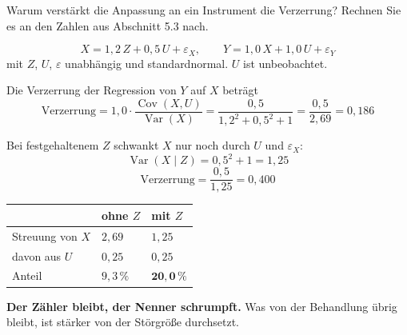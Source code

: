 \begin{aufgabe}
Warum verstärkt die Anpassung an ein Instrument die Verzerrung? Rechnen Sie es an den Zahlen aus Abschnitt 5.3 nach.

\loesung
{}
\[ X = 1{,}2\,Z + 0{,}5\,U + \varepsilon_X, \qquad Y = 1{,}0\,X + 1{,}0\,U + \varepsilon_Y \]
mit $Z$, $U$, $\varepsilon$ unabhängig und standardnormal. $U$ ist unbeobachtet.

Die Verzerrung der Regression von $Y$ auf $X$ beträgt
\[ \text{Verzerrung} = 1{,}0\cdot\frac{\operatorname{Cov}(X,U)}{\operatorname{Var}(X)} = \frac{0{,}5}{1{,}2^{2}+0{,}5^{2}+1} = \frac{0{,}5}{2{,}69} = 0{,}186 \]

 \checkmark

Bei festgehaltenem $Z$ schwankt $X$ nur noch durch $U$ und $\varepsilon_X$:
\[ \operatorname{Var}(X \mid Z) = 0{,}5^{2}+1 = 1{,}25 \]
\[ \text{Verzerrung} = \frac{0{,}5}{1{,}25} = 0{,}400 \]

 \checkmark

\begin{center}
{\small
\renewcommand{\arraystretch}{1.5}
\begin{tabular}{@{}P{3.0cm}P{2.4cm}P{2.4cm}@{}}
\toprule
& \textbf{ohne $Z$} & \textbf{mit $Z$}\\
\midrule
Streuung von $X$ & $2{,}69$ & $1{,}25$\\
davon aus $U$ & $0{,}25$ & $0{,}25$\\
Anteil & $9{,}3\,\%$ & $\mathbf{20{,}0\,\%}$\\
\bottomrule
\end{tabular}}
\end{center}

\begin{center}
\begin{minipage}{0.9\textwidth}
\textbf{Der Zähler bleibt, der Nenner schrumpft.} Was von der Behandlung übrig bleibt, ist stärker von der Störgröße durchsetzt.
\end{minipage}
\end{center}

\begin{center}
\begin{minipage}{0.88\textwidth}
\end{minipage}
\end{center}
\end{aufgabe}

